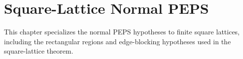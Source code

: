 
\chapter{Square-Lattice Normal PEPS}%
\label{ch:peps_normal_square}

This chapter specializes the normal PEPS hypotheses to finite square lattices,
including the rectangular regions and edge-blocking hypotheses used in the
square-lattice theorem.


